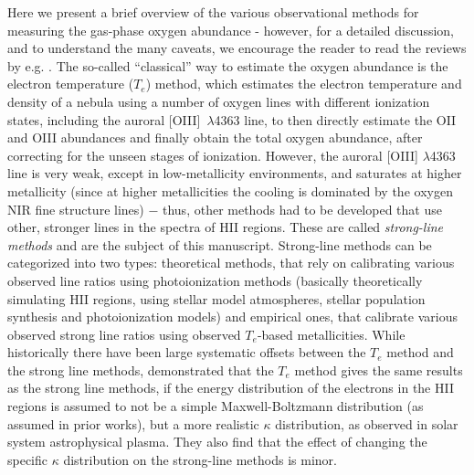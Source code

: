 \documentclass{emulateapj}
\begin{document}
Here we present a brief overview of the various observational methods for measuring the gas-phase oxygen abundance - however, for a detailed discussion, and to understand the many caveats, we encourage the reader to read the reviews by e.g. \citet{stasinska02,kewley08,moustakas10,stasinska10,dopita13,blanc15}.
The so-called ``classical'' way to estimate the oxygen abundance is the electron temperature ($T_e$) method, which estimates the electron temperature and density of a nebula using a number of oxygen lines with different ionization states, including the auroral [OIII]~$\lambda$4363 line, to then directly estimate the OII and OIII abundances and finally obtain the total oxygen abundance, after correcting for the unseen stages of ionization. However, the auroral [OIII] $\lambda$4363 line is very weak, except in low-metallicity environments, and saturates at higher metallicity (since at higher metallicities the cooling is dominated by the oxygen NIR fine structure lines)
$-$ thus, other methods had to be developed that use other, stronger lines in the spectra of HII regions. These are called \emph{strong-line methods} and are the subject of this manuscript. Strong-line methods can be categorized into two types: theoretical methods, that rely on calibrating various observed line ratios using photoionization methods (basically theoretically simulating HII regions, using stellar model atmospheres, stellar population synthesis and photoionization models) and empirical ones, that calibrate various observed strong line ratios using observed $T_e$-based metallicities. While historically there have been large systematic offsets between the $T_e$ method and the strong line methods, \citet{dopita13} demonstrated that the $T_e$ method gives the same results as the strong line methods, if the energy distribution of the electrons in the HII regions is assumed to not be a simple Maxwell-Boltzmann distribution (as assumed in prior works), but a more realistic $\kappa$ distribution, as observed in solar system astrophysical plasma. They also find that the effect of changing the specific $\kappa$ distribution on the strong-line methods is minor. 
\end{document}
